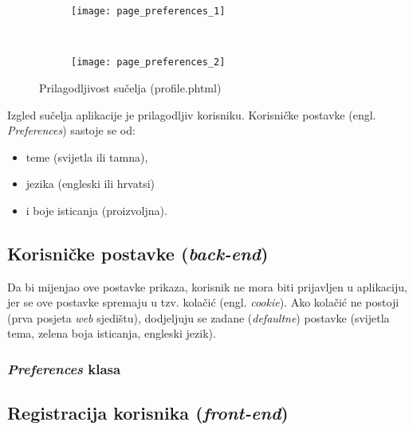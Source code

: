       \begin{figure}[h]
        \begin{center}
          \begin{subfigure}{0.65\textwidth}
            \texttt{[image: page\_preferences\_1]}
          \end{subfigure}
          \\
          \begin{subfigure}{0.65\textwidth}
            \texttt{[image: page\_preferences\_2]}
          \end{subfigure}

          \caption{Prilagodljivost sučelja (profile.phtml)}
        \end{center}
      \end{figure}

      Izgled sučelja aplikacije je prilagodljiv korisniku.
      Korisničke postavke (engl. \textit{Preferences}) sastoje se od:

      \begin{itemize}
        \item teme (svijetla ili tamna),
        \item jezika (engleski ili hrvatsi)
        \item i boje isticanja (proizvoljna).
      \end{itemize}


    \subsection{Korisničke postavke (\textit{back-end})}

      Da bi mijenjao ove postavke prikaza, korisnik ne mora biti
      prijavljen u aplikaciju, jer se ove postavke spremaju u tzv. kolačić
      (engl. \textit{cookie}). Ako kolačić ne postoji (prva posjeta \textit{web}
      sjedištu), dodjeljuju se zadane (\textit{defaultne}) postavke (svijetla
      tema, zelena boja isticanja, engleski jezik).

      \subsubsection{\textit{Preferences} klasa}

        

  \subsection{Registracija korisnika (\textit{front-end})}

